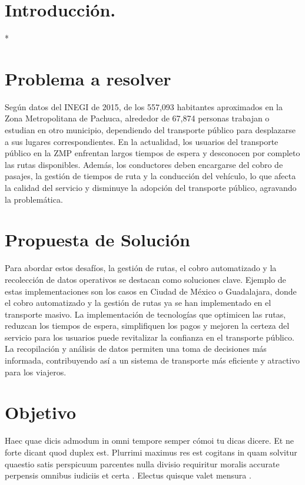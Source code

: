 \documentclass[10pt]{article}
\begin{document}
\section{Introducción.} 


*


\section{Problema a resolver}

Según datos del INEGI de 2015, de los 557,093 habitantes aproximados en la Zona Metropolitana de Pachuca, alrededor de 67,874 personas trabajan o estudian en otro municipio, dependiendo del transporte público para desplazarse a sus lugares correspondientes. En la actualidad, los usuarios del transporte público en la ZMP enfrentan largos tiempos de espera y desconocen por completo las rutas disponibles. Además, los conductores deben encargarse del cobro de pasajes, la gestión de tiempos de ruta y la conducción del vehículo, lo que afecta la calidad del servicio y disminuye la adopción del transporte público, agravando la problemática. 
\cite{IEEEreferencias:Ref4}

\section{Propuesta de Solución}
Para abordar estos desafíos, la gestión de rutas, el cobro automatizado y la recolección de datos operativos se destacan como soluciones clave. Ejemplo de estas implementaciones son los casos en Ciudad de México o Guadalajara, donde el cobro automatizado y la gestión de rutas ya se han implementado en el transporte masivo. La implementación de tecnologías que optimicen las rutas, reduzcan los tiempos de espera, simplifiquen los pagos y mejoren la certeza del servicio para los usuarios puede revitalizar la confianza en el transporte público. La recopilación y análisis de datos permiten una toma de decisiones más informada, contribuyendo así a un sistema de transporte más eficiente y atractivo para los viajeros.
\cite{IEEEreferencias:Ref5}
\cite{IEEEreferencias:Ref6}

\section{Objetivo}
Haec quae dicis admodum in omni tempore semper cómoi tu dicas dicere. Et ne forte dicant quod duplex est. Plurrimi maximus res est cogitans in quam solvitur quaestio satis perspicuum parcentes nulla divisio requiritur moralis accurate perpensis omnibus iudiciis et certa . Electus quisque valet mensura .
\end{document}
